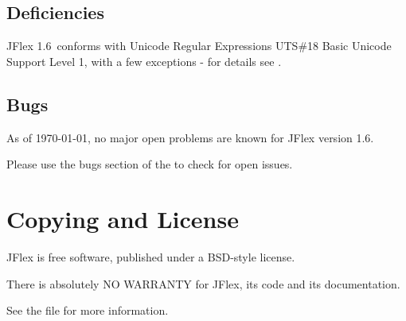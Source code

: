 \documentclass[11pt]{scrartcl}
\newcommand{\ver}{1.6}
\begin{document}
\subsection{Deficiencies}
JFlex \ver\ conforms with Unicode Regular Expressions
UTS\#18 \cite{unicode_rep} Basic Unicode Support Level 1, with
a few exceptions - for details see 
.

\subsection{Bugs}
As of {\today}, no major open problems are known for JFlex version \ver. 

Please use the bugs section of the
to check for open issues.
 

\section{Copying and License}\label{Copyright}
JFlex is free software, published under a BSD-style license.

There is absolutely NO WARRANTY for JFlex, its code and its documentation.

See the file  for more
information.
\end{document}
